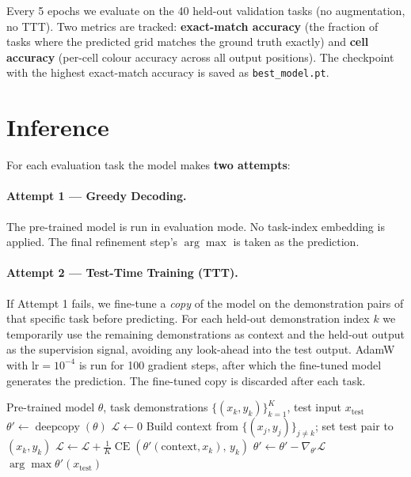 \documentclass[11pt,a4paper]{article}
\begin{document}
Every 5 epochs we evaluate on the 40 held-out validation tasks (no augmentation,
no TTT).  Two metrics are tracked: \textbf{exact-match accuracy} (the fraction of tasks
where the predicted grid matches the ground truth exactly) and \textbf{cell accuracy}
(per-cell colour accuracy across all output positions).  The checkpoint with the highest
exact-match accuracy is saved as \texttt{best\_model.pt}.

\section{Inference}
\label{sec:inference}

For each evaluation task the model makes \textbf{two attempts}:

\paragraph{Attempt 1 — Greedy Decoding.}
The pre-trained model is run in evaluation mode.  No task-index embedding is applied.
The final refinement step's $\arg\max$ is taken as the prediction.

\paragraph{Attempt 2 — Test-Time Training (TTT).}
If Attempt 1 fails, we fine-tune a \emph{copy} of the model on the demonstration pairs
of that specific task before predicting.  For each held-out demonstration index $k$
we temporarily use the remaining demonstrations as context and the held-out output as
the supervision signal, avoiding any look-ahead into the test output.  AdamW with
$\text{lr}=10^{-4}$ is run for 100 gradient steps, after which the fine-tuned model
generates the prediction.  The fine-tuned copy is discarded after each task.

\begin{algorithm}[H]
\caption{Test-Time Training (TTT) for one task}
\label{alg:ttt}
\begin{algorithmic}[1]
\Require Pre-trained model $\theta$, task demonstrations $\{(x_k, y_k)\}_{k=1}^K$, test input $x_{\text{test}}$
\State $\theta' \leftarrow \operatorname{deepcopy}(\theta)$
  \State $\mathcal{L} \leftarrow 0$
    \State Build context from $\{(x_j, y_j)\}_{j \neq k}$; set test pair to $(x_k, y_k)$
    \State $\mathcal{L} \leftarrow \mathcal{L} + \frac{1}{K}\operatorname{CE}(\theta'(\text{context}, x_k),\, y_k)$
  \EndFor
  \State $\theta' \leftarrow \theta' - \nabla_{\theta'}\mathcal{L}$
\EndFor
\State \Return $\arg\max \theta'(x_{\text{test}})$
\end{algorithmic}
\end{algorithm}
\end{document}

